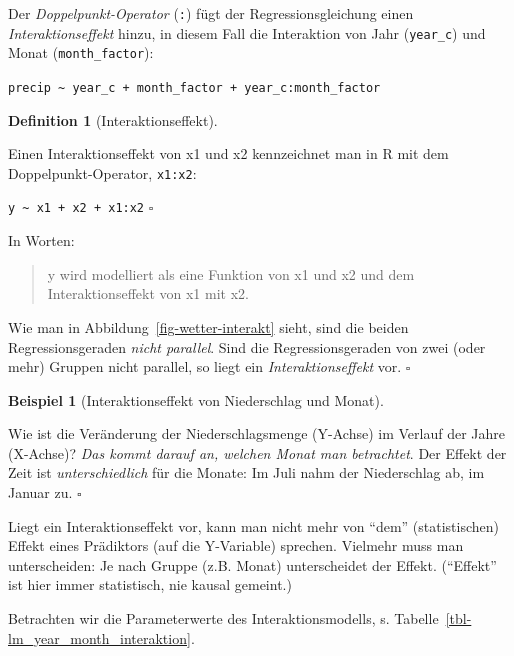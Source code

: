 \documentclass[
  letterpaper,
]{scrbook}
\theoremstyle{definition}
\theoremstyle{definition}
\newtheorem{example}{Beispiel}[chapter]
\theoremstyle{definition}
\newtheorem{definition}{Definition}[chapter]
\theoremstyle{remark}
\begin{document}
Der \emph{Doppelpunkt-Operator} (\texttt{:}) fügt der
Regressionsgleichung einen \emph{Interaktionseffekt} hinzu, in diesem
Fall die Interaktion von Jahr (\texttt{year\_c}) und Monat
(\texttt{month\_factor}):

\texttt{precip\ \textasciitilde{}\ year\_c\ +\ month\_factor\ +\ year\_c:month\_factor}

\begin{definition}[Interaktionseffekt]\protect\hypertarget{def-interakt}{}\label{def-interakt}

Einen Interaktionseffekt von x1 und x2 kennzeichnet man in R mit dem
Doppelpunkt-Operator, \texttt{x1:x2}:

\texttt{y\ \textasciitilde{}\ x1\ +\ x2\ +\ x1:x2} \(\square\)

In Worten:

\begin{quote}
y wird modelliert als eine Funktion von x1 und x2 und dem
Interaktionseffekt von x1 mit x2.
\end{quote}

Wie man in Abbildung~\ref{fig-wetter-interakt} sieht, sind die beiden
Regressionsgeraden \emph{nicht parallel}. Sind die Regressionsgeraden
von zwei (oder mehr) Gruppen nicht parallel, so liegt ein
\emph{Interaktionseffekt} vor. \(\square\)

\begin{example}[Interaktionseffekt von Niederschlag und
Monat]\protect\hypertarget{exm-interakt-precip}{}\label{exm-interakt-precip}

Wie ist die Veränderung der Niederschlagsmenge (Y-Achse) im Verlauf der
Jahre (X-Achse)? \emph{Das kommt darauf an, welchen Monat man
betrachtet}. Der Effekt der Zeit ist \emph{unterschiedlich} für die
Monate: Im Juli nahm der Niederschlag ab, im Januar zu. \(\square\)

\end{example}

Liegt ein Interaktionseffekt vor, kann man nicht mehr von \enquote{dem}
(statistischen) Effekt eines Prädiktors (auf die Y-Variable) sprechen.
Vielmehr muss man unterscheiden: Je nach Gruppe (z.B. Monat)
unterscheidet der Effekt. (\enquote{Effekt} ist hier immer statistisch,
nie kausal gemeint.)

Betrachten wir die Parameterwerte des Interaktionsmodells, s.
Tabelle~\ref{tbl-lm_year_month_interaktion}.

\begin{longtable}[]{@{}
  >{\raggedright\arraybackslash}p{}
  >{\centering\arraybackslash}p{}
  >{\centering\arraybackslash}p{}
  >{\centering\arraybackslash}p{}
  >{\centering\arraybackslash}p{}
  >{\centering\arraybackslash}p{}@{}}


\end{longtable}
\end{definition}
\end{document}
